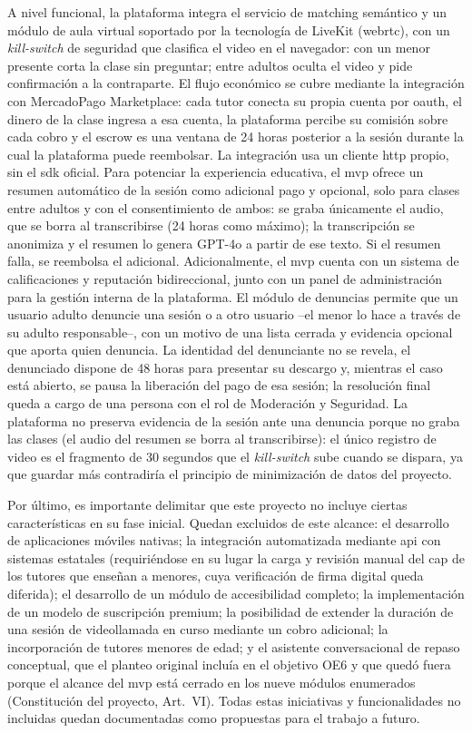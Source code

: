 A nivel funcional, la plataforma integra el servicio de \gls{matching}
semántico y un módulo de aula virtual soportado por la tecnología de
LiveKit (\gls{webrtc}), con un \emph{kill-switch} de seguridad que
clasifica el video en el navegador: con un menor presente corta la
clase sin preguntar; entre adultos oculta el video y pide confirmación
a la contraparte. El flujo económico se cubre mediante la integración
con MercadoPago Marketplace: cada tutor conecta su propia cuenta por
\gls{oauth}, el dinero de la clase ingresa a esa cuenta, la plataforma
percibe su comisión sobre cada cobro y el \gls{escrow} es una ventana
de 24 horas posterior a la sesión durante la cual la plataforma puede
reembolsar. La integración usa un cliente \gls{http} propio, sin el
\gls{sdk} oficial. Para potenciar la experiencia educativa, el
\gls{mvp} ofrece un resumen automático de la sesión como adicional
pago y opcional, solo para clases entre adultos y con el
consentimiento de ambos: se graba únicamente el audio, que se borra al
transcribirse (24 horas como máximo); la transcripción se anonimiza y
el resumen lo genera GPT-4o a partir de ese texto. Si el resumen falla,
se reembolsa el adicional. Adicionalmente, el \gls{mvp} cuenta con un
sistema de calificaciones y reputación bidireccional, junto con un
panel de administración para la gestión interna de la plataforma. El
módulo de denuncias permite que un usuario adulto denuncie una sesión
o a otro usuario --el menor lo hace a través de su adulto
responsable--, con un motivo de una lista cerrada y evidencia
opcional que aporta quien denuncia. La identidad del denunciante no se
revela, el denunciado dispone de 48 horas para presentar su descargo y,
mientras el caso está abierto, se pausa la liberación del pago de esa
sesión; la resolución final queda a cargo de una persona con el rol de
Moderación y Seguridad. La plataforma no preserva evidencia de la
sesión ante una denuncia porque no graba las clases (el audio del
resumen se borra al transcribirse): el único registro de video es el
fragmento de 30 segundos que el \emph{kill-switch} sube cuando se
dispara, ya que guardar más contradiría el principio de minimización
de datos del proyecto.

Por último, es importante delimitar que este proyecto no incluye ciertas
características en su fase inicial. Quedan excluidos de este alcance:
el desarrollo de aplicaciones móviles nativas; la integración
automatizada mediante \gls{api} con sistemas estatales (requiriéndose en
su lugar la carga y revisión manual del \gls{cap} de los tutores que
enseñan a menores, cuya verificación de firma digital queda diferida);
el desarrollo de un módulo de accesibilidad completo; la implementación
de un modelo de suscripción premium; la posibilidad de extender la
duración de una sesión de videollamada en curso mediante un cobro
adicional; la incorporación de tutores menores de edad; y el asistente
conversacional de repaso conceptual, que el planteo original incluía en
el objetivo OE6 y que quedó fuera porque el alcance del \gls{mvp} está
cerrado en los nueve módulos enumerados (Constitución del proyecto,
Art.~VI). Todas estas iniciativas y funcionalidades no incluidas quedan
documentadas como propuestas para el trabajo a futuro.

